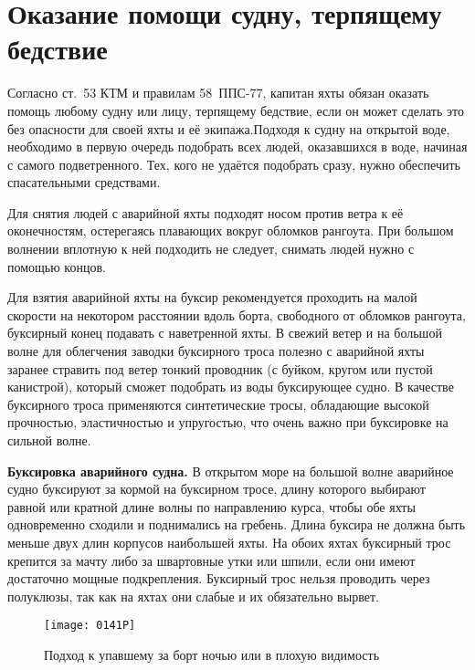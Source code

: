 \section{Оказание помощи судну, терпящему бедствие}

Согласно ст.~53 КТМ и правилам 58~ППС-77, капитан яхты обязан оказать
помощь любому судну или лицу, терпящему бедствие, если он может
сделать это без опасности для своей яхты и её экипажа.Подходя к судну
на открытой воде, необходимо в первую очередь подобрать всех людей,
оказавшихся в воде, начиная с самого подветренного. Тех, кого не
удаётся подобрать сразу, нужно обеспечить спасательными средствами.

Для снятия людей с аварийной яхты подходят носом против ветра к её
оконечностям, остерегаясь плавающих вокруг обломков рангоута. При
большом волнении вплотную к ней подходить не следует, снимать людей
нужно с помощью концов.

Для взятия аварийной яхты на буксир рекомендуется проходить на малой
скорости на некотором расстоянии вдоль борта, свободного от обломков
рангоута, буксирный конец подавать с наветренной яхты. В свежий ветер
и на большой волне для облегчения заводки буксирного троса полезно с
аварийной яхты заранее стравить под ветер тонкий проводник (с буйком,
кругом или пустой канистрой), который сможет подобрать из воды
буксирующее судно. В качестве буксирного троса применяются
синтетические тросы, обладающие высокой прочностью, эластичностью и
упругостью, что очень важно при буксировке на сильной волне.

\textbf{Буксировка аварийного судна.} В открытом море на большой волне
аварийное судно буксируют за кормой на буксирном тросе, длину которого
выбирают равной или кратной длине волны по направлению курса, чтобы
обе яхты одновременно сходили и поднимались на гребень. Длина буксира
не должна быть меньше двух длин корпусов наибольшей яхты. На обоих
яхтах буксирный трос крепится за мачту либо за швартовные утки или
шпили, если они имеют достаточно мощные подкрепления. Буксирный трос
нельзя проводить через полуклюзы, так как на яхтах они слабые и их
обязательно вырвет.

\begin{figure}[htb]
  \centering{}
  \texttt{[image: 0141P]}
  \caption{Подход к упавшему за борт ночью или в плохую видимость}
  \label{fig:141}
\end{figure}

